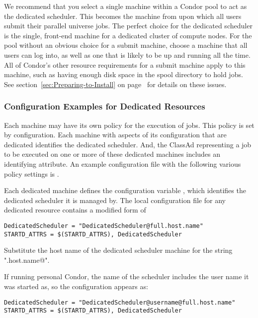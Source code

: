 We recommend that you select a single machine within a 
Condor pool to act as the dedicated scheduler.
This becomes the machine from upon which all users submit their 
parallel universe jobs.
The perfect choice for the dedicated scheduler 
is the single, front-end machine for
a dedicated cluster of compute nodes.
For the pool without an obvious choice for a submit machine,
choose a machine that all users can log into, as well as one
that is likely to be up and running all the time.
All of Condor's other resource requirements for a submit machine apply to
this machine, such as having enough disk space in the spool
directory to hold jobs. See section~\ref{sec:Preparing-to-Install} on
page~\pageref{sec:Preparing-to-Install} for details on these issues. 

\subsubsection{\label{sec:Configure-Dedicated-Resource}
Configuration Examples for Dedicated Resources} 

Each machine may have its own policy for the execution of jobs.
This policy is set by configuration.
Each machine with aspects of its configuration that are dedicated
identifies the dedicated scheduler.
And, the ClassAd representing a job to be executed on
one or more of these dedicated machines includes an identifying attribute.
An example configuration file with the following various policy settings
is .

Each dedicated machine defines the configuration variable
, which identifies
the dedicated scheduler it is managed by.
The local configuration file for any dedicated resource contains
a modified form of

\begin{verbatim}
DedicatedScheduler = "DedicatedScheduler@full.host.name"
STARTD_ATTRS = $(STARTD_ATTRS), DedicatedScheduler
\end{verbatim}

Substitute the host name of the dedicated scheduler
machine for the string "\verb@full.host.name@". 

If running personal Condor, the name of the scheduler includes
the user name it was started as, so the configuration appears as:

\begin{verbatim}
DedicatedScheduler = "DedicatedScheduler@username@full.host.name"
STARTD_ATTRS = $(STARTD_ATTRS), DedicatedScheduler
\end{verbatim}

